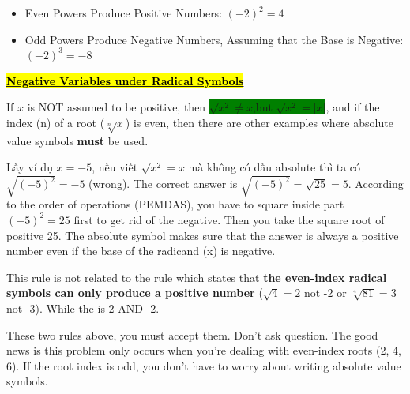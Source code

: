 \begin{itemize}
  \item Even Powers Produce Positive Numbers: $(-2)^{2}=4$
  \item Odd Powers Produce Negative Numbers, Assuming that the Base is Negative: $(-2)^{3}=-8$
\end{itemize}

\vspace{0.3 cm}

\centerline{\underline{\textbf{\large \hl{Negative Variables under Radical Symbols}}}}

\begin{tcolorbox}[colback=red!5!white,colframe=red!75!black]
  If $x$ is NOT assumed to be positive, then \colorbox{green}{$\sqrt{x^{2}} \neq x$,but $\sqrt{x^{2}}=|x|$}, and if the index (n) of a root ($\sqrt[n]{x}$) is even, then there are other examples where absolute value symbols \textbf{must} be used.
\end{tcolorbox}

Lấy ví dụ $x=-5$, nếu viết $\sqrt{x^{2}}=x$ mà không có dấu absolute thì ta có $\sqrt{(-5)^{2}}=-5$ (wrong). The correct answer is $\sqrt{(-5)^{2}}=\sqrt{25}=5$. According to the order of operations (PEMDAS), you have to square inside part $(-5)^{2}=25$ first to get rid of the negative. Then you take the square root of positive 25. The absolute symbol makes sure that the answer is always a positive number even if the base of the radicand (x) is negative.

This rule is not related to the rule which states that \textbf{the even-index radical symbols can only produce a positive number} ($\sqrt{4}=2$ not -2 or $\sqrt[4]{81}=3$ not -3). While the  is 2 AND -2.

These two rules above, you must accept them. Don't ask question. The good news is this problem only occurs when you're dealing with even-index roots (2, 4, 6). If the root index is odd, you don't have to worry about writing absolute value symbols.

\vspace{.5cm}


